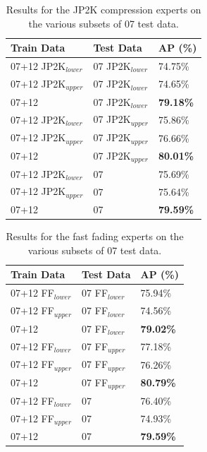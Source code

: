 \begin{table}[!htbp]
\centering
\caption{Results for the JP2K compression experts on the various subsets of 07 test data.}
\label{tab:jp2k_experts}
\begin{tabular}{|l|l|l|}
\hline
\textbf{Train Data}           & \textbf{Test Data}        & \textbf{AP (\%)} \\ \hline
07+12 JP2K$_{lower}$ & 07 JP2K$_{lower}$ & 74.75\% \\ \hline
07+12 JP2K$_{upper}$ & 07 JP2K$_{lower}$ & 74.65\% \\ \hline
07+12               & 07 JP2K$_{lower}$ & \textbf{79.18\%} \\ \hline
07+12 JP2K$_{lower}$ & 07 JP2K$_{upper}$ & 75.86\% \\ \hline
07+12 JP2K$_{upper}$ & 07 JP2K$_{upper}$ & 76.66\% \\ \hline
07+12               & 07 JP2K$_{upper}$ & \textbf{80.01\%} \\ \hline
07+12 JP2K$_{lower}$ & 07               & 75.69\% \\ \hline
07+12 JP2K$_{upper}$ & 07               & 75.64\% \\ \hline
07+12               & 07               & \textbf{79.59\%} \\ \hline
\end{tabular}
\end{table}


\begin{table}[!htbp]
\centering
\caption{Results for the fast fading experts on the various subsets of 07 test data.}
\label{tab:ff_experts}
\begin{tabular}{|l|l|l|}
\hline
\textbf{Train Data}           & \textbf{Test Data}        & \textbf{AP (\%)} \\ \hline
07+12 FF$_{lower}$ & 07 FF$_{lower}$ & 75.94\% \\ \hline
07+12 FF$_{upper}$ & 07 FF$_{lower}$ & 74.56\% \\ \hline
07+12               & 07 FF$_{lower}$ & \textbf{79.02\%} \\ \hline
07+12 FF$_{lower}$ & 07 FF$_{upper}$ & 77.18\% \\ \hline
07+12 FF$_{upper}$ & 07 FF$_{upper}$ & 76.26\% \\ \hline
07+12               & 07 FF$_{upper}$ & \textbf{80.79\%} \\ \hline
07+12 FF$_{lower}$ & 07               & 76.40\% \\ \hline
07+12 FF$_{upper}$ & 07               & 74.93\% \\ \hline
07+12               & 07               & \textbf{79.59\%} \\ \hline
\end{tabular}
\end{table}

